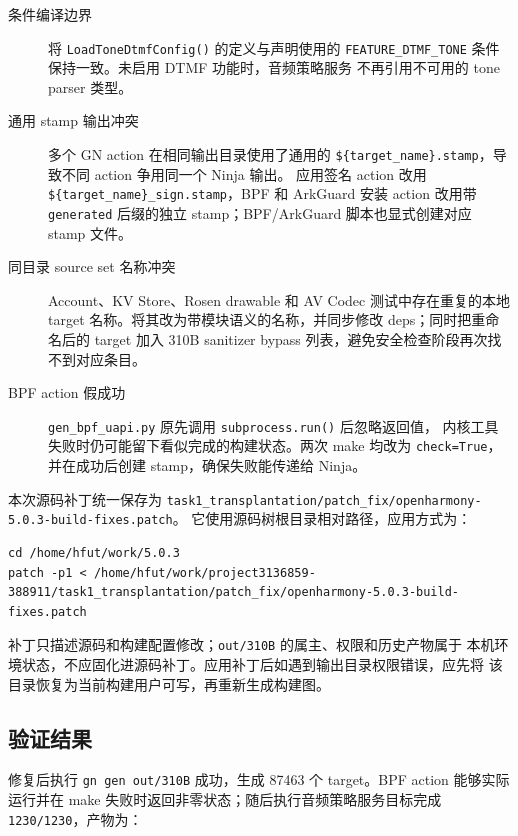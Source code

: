 \begin{description}
  \item[条件编译边界]
  将 \texttt{LoadToneDtmfConfig()} 的定义与声明使用的
  \texttt{FEATURE\_DTMF\_TONE} 条件保持一致。未启用 DTMF 功能时，音频策略服务
  不再引用不可用的 tone parser 类型。

  \item[通用 stamp 输出冲突]
  多个 GN action 在相同输出目录使用了通用的
  \texttt{\$\{target\_name\}.stamp}，导致不同 action 争用同一个 Ninja 输出。
  应用签名 action 改用 \texttt{\$\{target\_name\}\_sign.stamp}，BPF 和
  ArkGuard 安装 action 改用带 \texttt{generated} 后缀的独立 stamp；BPF/ArkGuard
  脚本也显式创建对应 stamp 文件。

  \item[同目录 source set 名称冲突]
  Account、KV Store、Rosen drawable 和 AV Codec 测试中存在重复的本地 target
  名称。将其改为带模块语义的名称，并同步修改 deps；同时把重命名后的 target
  加入 310B sanitizer bypass 列表，避免安全检查阶段再次找不到对应条目。

  \item[BPF action 假成功]
  \texttt{gen\_bpf\_uapi.py} 原先调用 \texttt{subprocess.run()} 后忽略返回值，
  内核工具失败时仍可能留下看似完成的构建状态。两次 make 均改为
  \texttt{check=True}，并在成功后创建 stamp，确保失败能传递给 Ninja。
\end{description}

本次源码补丁统一保存为
\texttt{task1\_transplantation/patch\_fix/openharmony-5.0.3-build-fixes.patch}。
它使用源码树根目录相对路径，应用方式为：

\begin{lstlisting}[style=shell]
cd /home/hfut/work/5.0.3
patch -p1 < /home/hfut/work/project3136859-388911/task1_transplantation/patch_fix/openharmony-5.0.3-build-fixes.patch
\end{lstlisting}

补丁只描述源码和构建配置修改；\texttt{out/310B} 的属主、权限和历史产物属于
本机环境状态，不应固化进源码补丁。应用补丁后如遇到输出目录权限错误，应先将
该目录恢复为当前构建用户可写，再重新生成构建图。

\subsection{验证结果}

修复后执行 \texttt{gn gen out/310B} 成功，生成 87463 个 target。BPF action
能够实际运行并在 make 失败时返回非零状态；随后执行音频策略服务目标完成
\texttt{1230/1230}，产物为：

